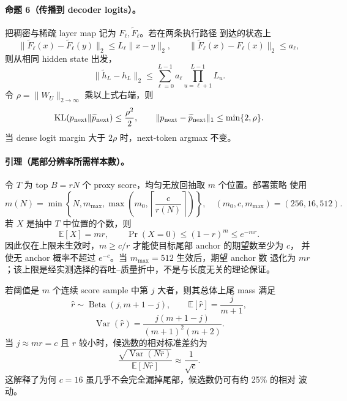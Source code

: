 \paragraph{命题 6（传播到 decoder logits）。}
把稠密与稀疏 layer map 记为 $F_\ell,\widetilde F_\ell$。若在两条执行路径
到达的状态上
\[
 \|\widetilde F_\ell(x)-\widetilde F_\ell(y)\|_2
 \le L_\ell\|x-y\|_2,\qquad
 \|\widetilde F_\ell(x)-F_\ell(x)\|_2\le a_\ell,
\]
则从相同 hidden state 出发，
\begin{equation}
 \|\widetilde h_L-h_L\|_2
 \le\sum_{\ell=0}^{L-1}a_\ell
       \prod_{u=\ell+1}^{L-1}L_u.
 \label{eq:layer-propagation}
\end{equation}
令 $\rho=\|W_U\|_{2\to\infty}$ 乘以上式右端，则
\begin{equation}
 \mathrm{KL}(p_{\rm next}\|\widetilde p_{\rm next})\le\frac{\rho^2}{2},
 \qquad
 \|p_{\rm next}-\widetilde p_{\rm next}\|_1\le\min\{2,\rho\}.
 \label{eq:next-token-stability}
\end{equation}
当 dense logit margin 大于 $2\rho$ 时，next-token argmax 不变。

\paragraph{引理（尾部分辨率所需样本数）。}
令 $T$ 为 top $B=rN$ 个 proxy score，均匀无放回抽取 $m$ 个位置。部署策略
使用
\begin{equation}
 m(N)=\min\left\{N,m_{\max},
 \max\left(m_0,\left\lceil\frac{c}{r(N)}\right\rceil\right)\right\},
 \quad(m_0,c,m_{\max})=(256,16,512).
 \label{eq:tail-resolution-samples}
\end{equation}
若 $X$ 是抽中 $T$ 中位置的个数，则
\begin{equation}
 \mathbb E[X]=mr,\qquad
 \Pr(X=0)\le(1-r)^m\le e^{-mr}.
 \label{eq:tail-sample-no-hit}
\end{equation}
因此仅在上限未生效时，$m\ge c/r$ 才能使目标尾部 anchor 的期望数至少为 $c$，
并使无 anchor 概率不超过 $e^{-c}$。当 $m_{\max}=512$ 生效后，期望 anchor 数
退化为 $mr$；该上限是经实测选择的吞吐--质量折中，不是与长度无关的理论保证。

若阈值是 $m$ 个连续 score sample 中第 $j$ 大者，则其总体上尾 mass 满足
\begin{equation}
 \widehat r\sim\operatorname{Beta}(j,m+1-j),\qquad
 \mathbb E[\widehat r]=\frac{j}{m+1},
 \label{eq:sample-quantile-beta}
\end{equation}
\begin{equation}
 \operatorname{Var}(\widehat r)
 =\frac{j(m+1-j)}{(m+1)^2(m+2)}.
 \label{eq:sample-quantile-variance}
\end{equation}
当 $j\approx mr=c$ 且 $r$ 较小时，候选数的相对标准差约为
\begin{equation}
 \frac{\sqrt{\operatorname{Var}(N\widehat r)}}
 {\mathbb E[N\widehat r]}
 \approx\frac1{\sqrt c}.
 \label{eq:candidate-count-relative-std}
\end{equation}
这解释了为何 $c=16$ 虽几乎不会完全漏掉尾部，候选数仍可有约 25\% 的相对
波动。

